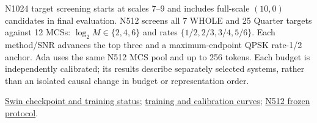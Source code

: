 \documentclass[11pt,letterpaper]{article}
\begin{document}
N1024 target screening starts at scales 7--9 and includes full-scale $(10,0)$ candidates in final evaluation. N512 screens all 7 WHOLE and 25 Quarter targets against 12 MCSs: $\log_2 M\in\{2,4,6\}$ and rates $\{1/2,2/3,3/4,5/6\}$. Each method/SNR advances the top three and a maximum-endpoint QPSK rate-1/2 anchor. Ada uses the same N512 MCS pool and up to 256 tokens. Each budget is independently calibrated; its results describe separately selected systems, rather than an isolated causal change in budget or representation order.

\href{https://github.com/daiqizai/var-comm/blob/93205a2e007ac587e28246cd399a531347a4f3f7/results/baseline_strength_20261011/Swin_1to19/selected_checkpoint.json}{Swin checkpoint and training status}; \href{https://github.com/daiqizai/var-comm/blob/93205a2e007ac587e28246cd399a531347a4f3f7/results/baseline_strength_20261011/training_figures_v1/training_calibration_curves.pdf}{training and calibration curves}; \href{https://github.com/daiqizai/var-comm/blob/93205a2e007ac587e28246cd399a531347a4f3f7/results/nestcom_n512_20261028_v1/protocol.json}{N512 frozen protocol}.
\end{document}
